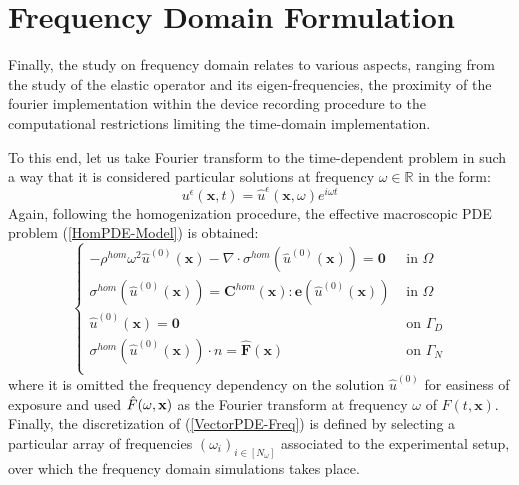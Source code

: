 \section{Frequency Domain Formulation}
Finally, the study on frequency domain relates to various aspects, ranging from the study of the elastic operator and its eigen-frequencies, the proximity of the fourier implementation within the device recording procedure to the computational restrictions limiting the time-domain implementation. 

To this end, let us take Fourier transform to the time-dependent problem in such a way that it is considered particular solutions at frequency $\omega \in \mathbb{R}$ in the form:
\begin{equation}
    \label{FreqAnsatz}
    u^{\epsilon}(\mathbf{x},t) = \hat{u}^{\epsilon}(\mathbf{x},\omega) e^{i \omega t}
\end{equation}
Again, following the homogenization procedure, the effective macroscopic PDE problem (\ref{HomPDE-Model}) is obtained:
\begin{equation}
    \label{VectorPDE-Freq}
    \left \{
    \begin{array}{cc}
        -\rho^{hom} \omega^2 \hat{u}^{(0)}(\mathbf{x}) - \nabla \cdot \sigma^{hom} (\hat{u}^{(0)}(\mathbf{x}))=\mathbf{0}  & \text{ in }  \Omega \\
        \sigma^{hom} (\hat{u}^{(0)}(\mathbf{x})) = \mathbf{C}^{hom}(\mathbf{x}): \mathbf{e} (\hat{u}^{(0)}(\mathbf{x})) & \text{ in } \Omega  \\
        \hat{u}^{(0)}(\mathbf{x}) = \mathbf{0} & \text{ on } \Gamma_D\\
        \sigma^{hom} (\hat{u}^{(0)}(\mathbf{x}))\cdot n = \hat{\mathbf{F}}(\mathbf{x}) & \text{ on } \Gamma_N \\
    \end{array}
    \right .
\end{equation}
where it is omitted the frequency dependency on the solution $\hat{u}^{(0)}$ for easiness of exposure and used $\Hat{F}(\omega, \mathbf{x})$ as the Fourier transform at frequency $\omega$ of $F(t, \mathbf{x})$. 
Finally, the discretization of (\ref{VectorPDE-Freq}) is defined by selecting a particular array of frequencies $(\omega_i)_{i \in [N_{\omega}]}$ associated to the experimental setup, over which the frequency domain simulations takes place.

